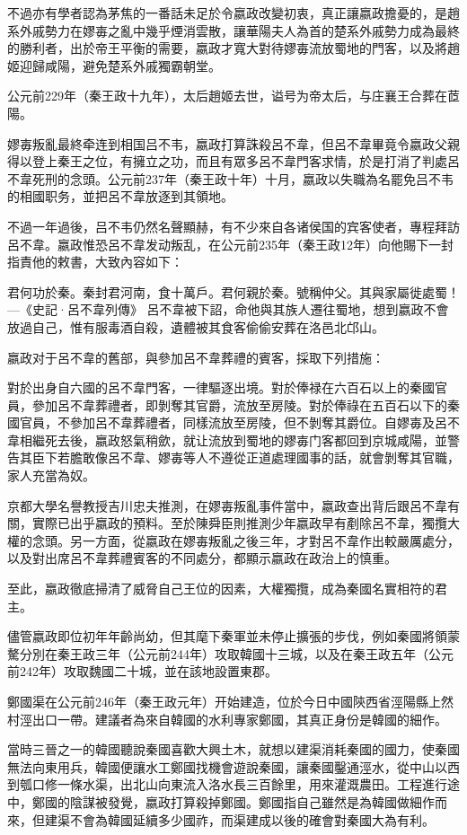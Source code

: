 不過亦有學者認為茅焦的一番話未足於令嬴政改變初衷，真正讓嬴政擔憂的，是趙系外戚勢力在嫪毐之亂中幾乎煙消雲散，讓華陽夫人為首的楚系外戚勢力成為最終的勝利者，出於帝王平衡的需要，嬴政才寬大對待嫪毐流放蜀地的門客，以及將趙姬迎歸咸陽，避免楚系外戚獨霸朝堂。

公元前229年（秦王政十九年），太后趙姬去世，谥号为帝太后，与庄襄王合葬在茝陽。

嫪毐叛亂最終牵连到相国吕不韦，嬴政打算誅殺呂不韋，但呂不韋畢竟令嬴政父親得以登上秦王之位，有擁立之功，而且有眾多呂不韋門客求情，於是打消了判處呂不韋死刑的念頭。公元前237年（秦王政十年）十月，嬴政以失職為名罷免吕不韦的相國职务，並把呂不韋放逐到其領地。

不過一年過後，吕不韦仍然名聲顯赫，有不少來自各诸侯国的宾客使者，專程拜訪呂不韋。嬴政惟恐呂不韋发动叛乱，在公元前235年（秦王政12年）向他賜下一封指責他的敕書，大致內容如下：

君何功於秦。秦封君河南，食十萬戶。君何親於秦。號稱仲父。其與家屬徙處蜀！
—《史記·呂不韋列傳》
呂不韋被下詔，命他與其族人遷往蜀地，想到嬴政不會放過自己，惟有服毒酒自殺，遺體被其食客偷偷安葬在洛邑北邙山。

嬴政对于呂不韋的舊部，與參加呂不韋葬禮的賓客，採取下列措施：

對於出身自六國的呂不韋門客，一律驅逐出境。對於俸禄在六百石以上的秦國官員，參加呂不韋葬禮者，即剝奪其官爵，流放至房陵。對於俸祿在五百石以下的秦國官員，不參加呂不韋葬禮者，同樣流放至房陵，但不剝奪其爵位。自嫪毐及呂不韋相繼死去後，嬴政怒氣稍歛，就让流放到蜀地的嫪毐门客都回到京城咸陽，並警告其臣下若膽敢像呂不韋、嫪毐等人不遵從正道處理國事的話，就會剝奪其官職，家人充當為奴。

京都大學名譽教授吉川忠夫推測，在嫪毐叛亂事件當中，嬴政查出背后跟呂不韋有關，實際已出乎嬴政的預料。至於陳舜臣則推測少年嬴政早有剷除呂不韋，獨攬大權的念頭。另一方面，從嬴政在嫪毐叛亂之後三年，才對呂不韋作出較嚴厲處分，以及對出席呂不韋葬禮賓客的不同處分，都顯示嬴政在政治上的慎重。

至此，嬴政徹底掃清了威脅自己王位的因素，大權獨攬，成為秦國名實相符的君主。

儘管嬴政即位初年年齡尚幼，但其麾下秦軍並未停止擴張的步伐，例如秦國將領蒙驁分別在秦王政三年（公元前244年）攻取韓國十三城，以及在秦王政五年（公元前242年）攻取魏國二十城，並在該地設置東郡。

鄭國渠在公元前246年（秦王政元年）开始建造，位於今日中國陝西省涇陽縣上然村涇出口一帶。建議者為來自韓國的水利專家鄭國，其真正身份是韓國的細作。

當時三晉之一的韓國聽說秦國喜歡大興土木，就想以建渠消耗秦國的國力，使秦國無法向東用兵，韓國便讓水工鄭國找機會遊說秦國，讓秦國鑿通涇水，從中山以西到瓠口修一條水渠，出北山向東流入洛水長三百餘里，用來灌溉農田。工程進行途中，鄭國的陰謀被發覺，嬴政打算殺掉鄭國。鄭國指自己雖然是為韓國做細作而來，但建渠不會為韓國延續多少國祚，而渠建成以後的確會對秦國大為有利。

